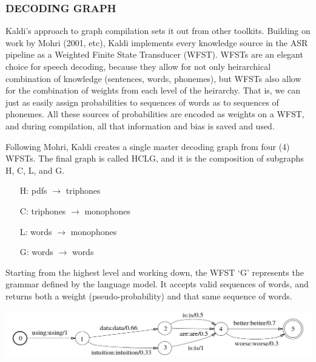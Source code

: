 \documentclass[10pt,a4paper]{article}
\begin{document}
    

\subsubsection{DECODING GRAPH}

Kaldi's approach to graph compilation sets it out from other toolkits. Building on work by Mohri (2001, etc), Kaldi implements every knowledge source in the ASR pipeline as a Weighted Finite State Transducer (WFST). WFSTs are an elegant choice for speech decoding, because they allow for not only heirarchical combination of knowledge (sentences, words, phonemes), but WFSTs also allow for the combination of weights from each level of the heirarchy. That is, we can just as easily assign probabilities to sequences of words as to sequences of phonemes. All these sources of probabilities are encoded as weights on a WFST, and during compilation, all that information and bias is saved and used.

Following Mohri, Kaldi creates a single master decoding graph from four (4) WFSTs. The final graph is called HCLG, and it is the composition of subgraphs H, C, L, and G.


\begin{enumerate}
\item[H:] pdfs $\rightarrow$ triphones
\item[C:] triphones $\rightarrow$ monophones
\item[L:] words $\rightarrow$ monophones
\item[G:] words $\rightarrow$ words
\end{enumerate}


Starting from the highest level and working down, the WFST `G' represents the grammar defined by the language model. It accepts valid sequences of words, and returns both a weight (pseudo-probability) and that same sequence of words.


\begin{center}
  \includegraphics[width=.9\textwidth,keepaspectratio]{figs/mohri-G.png}
\end{center}
\end{document}
